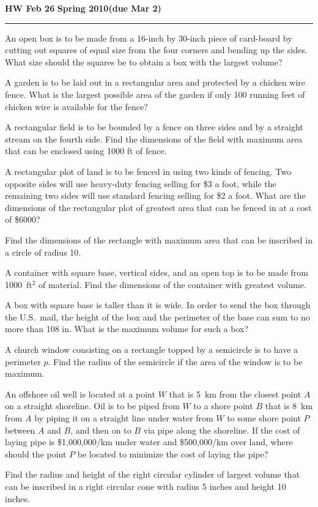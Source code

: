 \documentclass[12pt]{amsart}
\begin{document}
\hfill{\large\bf HW Feb 26}\hfill{\large\bf
  Spring 2010}\hfill{\large\bf (due Mar 2)}\hrule

\bigskip
{\problem An open box is to be made from a 16-inch by 30-inch piece of
  card-board by cutting out squares of equal size from the four
  corners and bending up the sides.  What size should the squares be
  to obtain a box with the largest volume?} 

{\problem A garden is to be laid out in a rectangular area and
  protected by a chicken wire fence. What is the largest possible area
  of the garden if only 100 running feet of chicken wire is available
  for the fence?}

{\problem A rectangular field is to be bounded by a fence on three
  sides and by a straight stream on the fourth side.  Find the
  dimensions of the field with maximum area that can be enclosed using
  1000 ft of fence.}

{\problem A rectangular plot of land is to be fenced in using two
  kinds of fencing.  Two opposite sides will use heavy-duty fencing
  selling for \$3 a foot, while the remaining two sides will use
  standard fencing selling for \$2 a foot.  What are the dimensions of
  the rectangular plot of greatest area that can be fenced in at a
  cost of \$6000?}

{\problem Find the dimensions of the rectangle with maximum area that
  can be inscribed in a circle of radius 10.}

{\problem A container with square base, vertical sides, and an open
  top is to be made from 1000~ft$^2$ of material.  Find the dimensions
  of the container with greatest volume.}

{\problem A box with square base is taller than it is wide.  In order
  to send the box through the U.S.~mail, the height of the box and the
  perimeter of the base can sum to no more than 108 in.  What is the
  maximum volume for such a box?}

{\problem A church window consisting on a rectangle topped by a
  semicircle is to have a perimeter $p$.  Find the radius of the
  semicircle if the area of the window is to be maximum.}

{\problem An offshore oil well is located at a point $W$ that is 5~km
  from the closest point $A$ on a straight shoreline.  Oil is to be
  piped from $W$ to a shore point $B$ that is 8~km from $A$ by piping
  it on a straight line under water from $W$ to some shore point $P$
  between $A$ and $B$, and then on to $B$ via pipe along the
  shoreline.  If the cost of laying pipe is \$1,000,000/km under water
  and \$500,000/km over land, where should the point $P$ be located to
  minimize the cost of laying the pipe?} 

{\problem Find the radius and height of the right circular cylinder of
  largest volume that can be inscribed in a right circular cone with
  radius 5 inches and height 10 inches.}
\end{document}
